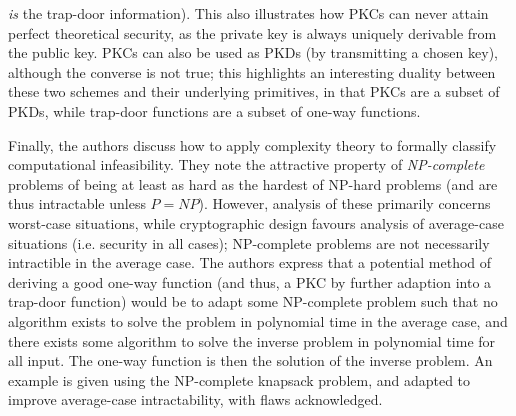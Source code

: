\documentclass[11pt]{article}
\begin{document}
\textit{is} the trap-door information). This also illustrates how PKCs can never
attain perfect theoretical security, as the private key is always uniquely
derivable from the public key. PKCs can also be used as PKDs (by transmitting a
chosen key), although the converse is not true; this highlights an interesting
duality between these two schemes and their underlying primitives, in that PKCs
are a subset of PKDs, while trap-door functions are a subset of one-way
functions.
\par
Finally, the authors discuss how to apply complexity theory to formally classify
computational infeasibility. They note the attractive property of
\textit{NP-complete} problems of being at least as hard as the hardest of
NP-hard problems (and are thus intractable unless \( P = NP \)). However,
analysis of these primarily concerns worst-case situations, while cryptographic
design favours analysis of average-case situations (i.e. security in all
cases); NP-complete problems are not necessarily intractible in the average
case. The authors express that a potential method of deriving a good one-way
function (and thus, a PKC by further adaption into a trap-door function) would
be to adapt some NP-complete problem such that no algorithm exists to solve the
problem in polynomial time in the average case, and there exists some algorithm
to solve the inverse problem in polynomial time for all input. The one-way
function is then the solution of the inverse problem. An example is given using
the NP-complete knapsack problem, and adapted to improve average-case
intractability, with flaws acknowledged. 
\end{document}

